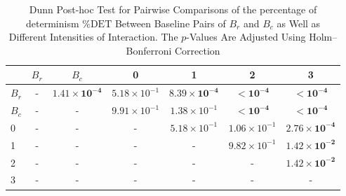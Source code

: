\begin{table*}[!t]
\caption{Dunn Post-hoc Test for Pairwise Comparisons of the percentage of determinism $\%\text{DET}$ Between Baseline Pairs of $B_r$ and $B_c$ as Well as Different Intensities of Interaction. The $p$-Values Are Adjusted Using Holm--Bonferroni Correction\label{tab:dunn_det}}
\centering
\begin{tabular}{lcccccc}
\toprule
 & $B_r$ & $B_c$ & 0 & 1 & 2 & 3 \\
\midrule
$B_r$ & - & $\mathbf{1.41 \times 10^{-4}}$ & $5.18 \times 10^{-1}$ & $\mathbf{8.39 \times 10^{-4}}$ & $\mathbf{< 10^{-4}}$ & $\mathbf{< 10^{-4}}$ \\
$B_c$ & - & - & $9.91 \times 10^{-1}$ & $1.38 \times 10^{-1}$ & $\mathbf{< 10^{-4}}$ & $\mathbf{< 10^{-4}}$ \\
0 & - & - & - & $5.18 \times 10^{-1}$ & $1.06 \times 10^{-1}$ & $\mathbf{2.76 \times 10^{-4}}$ \\
1 & - & - & - & - & $9.82 \times 10^{-1}$ & $\mathbf{1.42 \times 10^{-2}}$ \\
2 & - & - & - & - & - & $\mathbf{1.42 \times 10^{-2}}$ \\
3 & - & - & - & - & - & - \\
\bottomrule
\end{tabular}
\end{table*}

